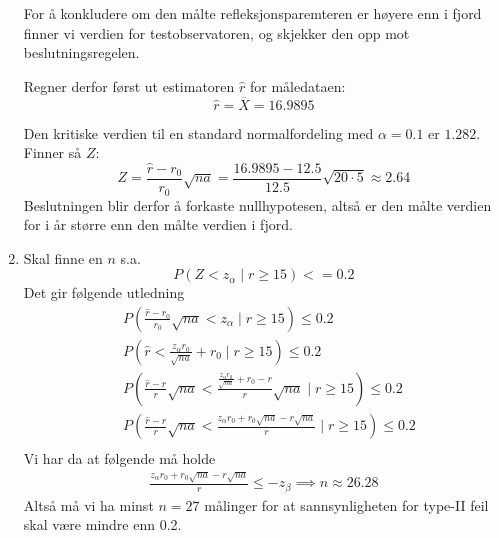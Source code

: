 \documentclass[a4paper,11pt,norsk]{article}
\begin{document}
\begin{enumerate}
        For å konkludere om den målte refleksjonsparemteren er høyere enn i fjord finner vi verdien for 
        testobservatoren, og skjekker den opp mot beslutningsregelen.
        
        Regner derfor først ut estimatoren $\hat{r}$ for måledataen:
        \[
            \hat{r} = \overline{X} = 16.9895
        \]

        Den kritiske verdien til en standard normalfordeling med $\alpha = 0.1$ er $1.282$.
        Finner så $Z$:
        \[
            Z = \frac{\hat{r} - r_0}{r_0} \sqrt{na} = \frac{16.9895 - 12.5}{12.5} \sqrt{20 \cdot 5} \approx 2.64
        \]
        Beslutningen blir derfor å forkaste nullhypotesen, altså er den målte verdien for i år større enn den målte verdien i fjord.

    \item Skal finne en $n$ s.a. 
        \[
            P(Z < z_{\alpha} \mid r \geq 15) <= 0.2
        \]
        Det gir følgende utledning
        \begin{align*}
            &P\left(\frac{\hat{r} - r_0}{r_0} \sqrt{na} < z_{\alpha} \mid r \geq 15\right) \leq 0.2 \\  
            &P\left(\hat{r} < \frac{z_{\alpha} r_0}{\sqrt{na}} + r_0 \mid r \geq 15\right) \leq 0.2 \\
            &P\left(\frac{\hat{r} - r}{r}\sqrt{na} < \frac{\frac{z_{\alpha} r_0}{\sqrt{na}} + r_0 - r}{r} \sqrt{na} \mid r \geq 15\right) \leq 0.2 \\
            &P\left(\frac{\hat{r} - r}{r}\sqrt{na} < \frac{z_{\alpha}r_0 + r_0\sqrt{na} - r\sqrt{na}}{r} \mid r \geq 15\right) \leq 0.2 \\
        \end{align*}
        Vi har da at følgende må holde
        \begin{align*}
            \frac{z_{\alpha}r_0 + r_0\sqrt{na} - r\sqrt{na}}{r} \leq - z_{\beta} \implies n \approx 26.28
        \end{align*}
        Altså må vi ha minst $n = 27$ målinger for at sannsynligheten for type-II feil skal være mindre enn 0.2.
\end{enumerate}
\end{document}

